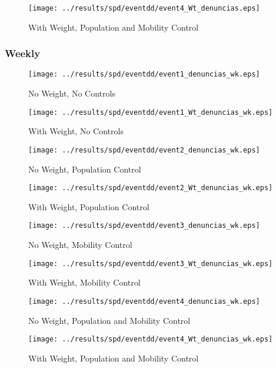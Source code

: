 \documentclass[11pt,letterpaper]{article}
\begin{document}
\begin{figure}[H]
\caption{With Weight, Population and Mobility Control}
\centering
\texttt{[image: ../results/spd/eventdd/event4\_Wt\_denuncias.eps]}
\end{figure}

		\subsubsection{Weekly}
\begin{figure}[H]
\caption{No Weight, No Controls}
\centering
\texttt{[image: ../results/spd/eventdd/event1\_denuncias\_wk.eps]}
\end{figure}

\begin{figure}[H]
\caption{With Weight, No Controls}
\centering
\texttt{[image: ../results/spd/eventdd/event1\_Wt\_denuncias\_wk.eps]}
\end{figure}
\begin{figure}[H]
\caption{No Weight, Population Control}
\centering
\texttt{[image: ../results/spd/eventdd/event2\_denuncias\_wk.eps]}
\end{figure}

\begin{figure}[H]
\caption{With Weight, Population Control}
\centering
\texttt{[image: ../results/spd/eventdd/event2\_Wt\_denuncias\_wk.eps]}
\end{figure}
\begin{figure}[H]
\caption{No Weight, Mobility Control}
\centering
\texttt{[image: ../results/spd/eventdd/event3\_denuncias\_wk.eps]}
\end{figure}

\begin{figure}[H]
\caption{With Weight, Mobility Control}
\centering
\texttt{[image: ../results/spd/eventdd/event3\_Wt\_denuncias\_wk.eps]}
\end{figure}
\begin{figure}[H]
\caption{No Weight, Population and Mobility Control}
\centering
\texttt{[image: ../results/spd/eventdd/event4\_denuncias\_wk.eps]}
\end{figure}

\begin{figure}[H]
\caption{With Weight, Population and Mobility Control}
\centering
\texttt{[image: ../results/spd/eventdd/event4\_Wt\_denuncias\_wk.eps]}
\end{figure}
\end{document}
